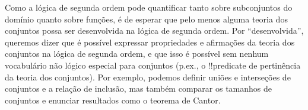 \documentclass[../../../include/open-logic-section]{subfiles}
\begin{document}


Como a lógica de segunda ordem pode quantificar tanto sobre subconjuntos do
domínio quanto sobre funções, é de esperar que pelo menos alguma teoria dos
conjuntos possa ser desenvolvida na lógica de segunda ordem. Por
``desenvolvida'', queremos dizer que é possível expressar propriedades e
afirmações da teoria dos conjuntos na lógica de segunda ordem, e que isso é
possível sem nenhum vocabulário não lógico especial para conjuntos (p.ex., o !!{predicate} de pertinência da teoria dos conjuntos). Por
exemplo, podemos definir uniões e interseções de conjuntos e a relação de
inclusão, mas também comparar os tamanhos de conjuntos e enunciar resultados
como o teorema de Cantor.
\end{document}
